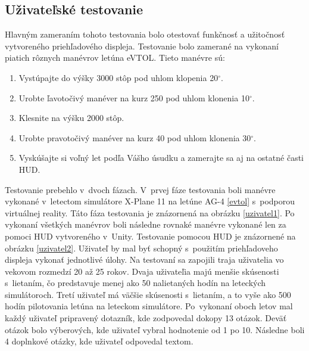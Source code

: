 \subsection{Uživateľské testovanie}
Hlavným zameraním tohoto testovania bolo otestovať funkčnosť a užitočnosť vytvoreného priehľadového displeja. Testovanie bolo zamerané na vykonaní piatich rôznych manévrov letúna eVTOL. Tieto manévre sú:
\begin{enumerate}
    \item Vystúpajte do výšky 3000 stôp pod uhlom klopenia 20$^\circ$.
    \item Urobte ľavotočivý manéver na kurz 250 pod uhlom klonenia 10$^\circ$.
    \item Klesnite na výšku 2000 stôp.
    \item Urobte pravotočivý manéver na kurz 40 pod uhlom klonenia 30$^\circ$.
    \item Vyskúšajte si voľný let podľa Vášho úsudku a zamerajte sa aj na ostatné časti HUD.
\end{enumerate}
Testovanie prebehlo v~dvoch fázach. V~prvej fáze testovania boli manévre vykonané v~letectom simulátore X-Plane 11 na letúne AG-4 \ref{evtol} s~podporou virtuálnej reality. Táto fáza testovania je znázornená na obrázku \ref{uzivatel1}. Po vykonaní všetkých manévrov boli následne rovnaké manévre vykonané len za pomoci HUD vytvoreného v~Unity. Testovanie pomocou HUD je znázornené na obrázku \ref{uzivatel2}. Uživateľ by mal byť schopný s~použitím priehľadoveho displeja vykonať jednotlivé úlohy. Na testovaní sa zapojili traja uživatelia vo vekovom rozmedzí 20 až 25 rokov. Dvaja uživateľia majú menšie skúsenosti s~lietaním, čo predstavuje menej ako 50 nalietaných hodín na leteckých simulátoroch. Tretí uživateľ má väčšie skúsenosti s~lietaním, a to vyše ako 500 hodín pilotovania letúna na leteckom simulátore. Po~vykonaní oboch letov mal každý uživateľ pripravený dotazník, kde zodpovedal dokopy 13 otázok. Deväť otázok bolo výberových, kde uživateľ vybral hodnotenie od 1 po 10. Následne boli 4 doplnkové otázky, kde uživateľ odpovedal textom.

